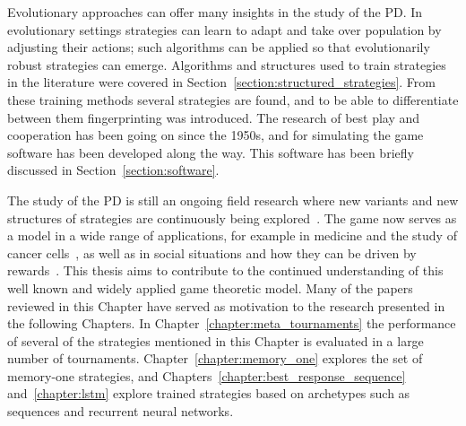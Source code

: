 Evolutionary approaches can offer many insights in the study of the PD. In
evolutionary settings strategies can learn to adapt and take over population by
adjusting their actions; such algorithms can be applied so that evolutionarily
robust strategies can emerge. Algorithms and structures used to train strategies
in the literature were covered in Section~\ref{section:structured_strategies}.
From these training methods several strategies are found,
and to be able to differentiate between them fingerprinting was
introduced. The research of best play and cooperation has been going on since
the 1950s, and for simulating the game software has been developed along the
way. This software has been briefly discussed
in Section~\ref{section:software}.

The study of the PD is still an ongoing field research where new variants and
new structures of strategies are
continuously being explored~\cite{Ohtsuki2018}. The game now serves as a model
in a wide range of applications, for example in medicine and the study of cancer
cells~\cite{archetti2018, Kaznatchee2017}, as well as in social situations and
how they can be driven by rewards~\cite{Dridi2018}.
This thesis aims to contribute to the continued understanding of this well known
and widely applied game theoretic model.
Many of the papers reviewed in this Chapter have served as motivation to the
research presented in the following Chapters. In
Chapter~\ref{chapter:meta_tournaments} the performance of several of the
strategies mentioned in this Chapter is evaluated in a large number of
tournaments. Chapter~\ref{chapter:memory_one} explores the set of memory-one
strategies, and Chapters~\ref{chapter:best_response_sequence} and~\ref{chapter:lstm}
explore trained strategies based on archetypes such as sequences and recurrent
neural networks.
